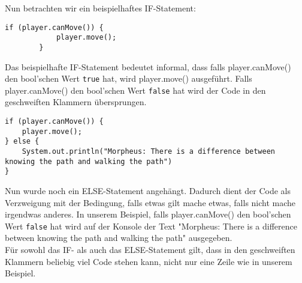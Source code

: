 \begin{Infobox}[IF-Verzweigung]
    Nun betrachten wir ein beispielhaftes IF-Statement:

    \begin{lstlisting}[breaklines=true, numbers=none]
        if (player.canMove()) {
            player.move();
        } 
    \end{lstlisting}

    Das beispielhafte IF-Statement bedeutet informal, dass falls player.canMove() den bool'schen Wert \lstinline{true} hat, wird player.move() ausgeführt. Falls player.canMove() den bool'schen Wert \lstinline{false} hat wird der Code in den geschweiften Klammern übersprungen.

    \begin{lstlisting}[breaklines=true, numbers=none]
if (player.canMove()) {
    player.move();
} else {
    System.out.println("Morpheus: There is a difference between knowing the path and walking the path")
}
    \end{lstlisting}

    Nun wurde noch ein ELSE-Statement angehängt. Dadurch dient der Code als Verzweigung mit der Bedingung, falls etwas gilt mache etwas, falls nicht mache irgendwas anderes. In unserem Beispiel, falls player.canMove() den bool'schen Wert \lstinline{false} hat wird auf der Konsole der Text "Morpheus: There is a difference between knowing the path and walking the path" ausgegeben.\\

    Für sowohl das IF- als auch das ELSE-Statement gilt, dass in den geschweiften Klammern beliebig viel Code stehen kann, nicht nur eine Zeile wie in unserem Beispiel.
\end{Infobox}


